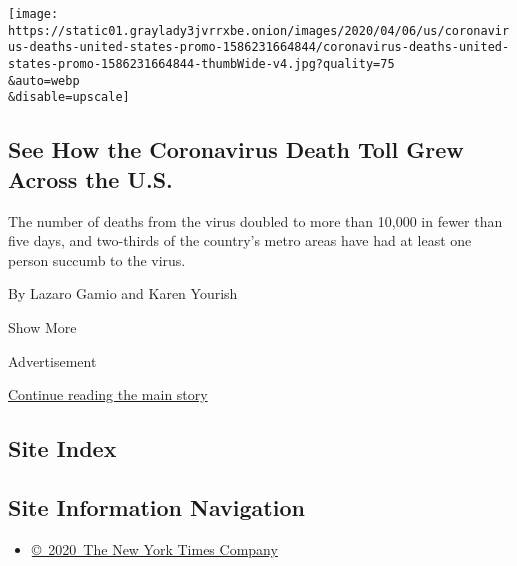 \begin{enumerate}
  \texttt{[image: https://static01.graylady3jvrrxbe.onion/images/2020/04/06/us/coronavirus-deaths-united-states-promo-1586231664844/coronavirus-deaths-united-states-promo-1586231664844-thumbWide-v4.jpg?quality=75\\\&auto=webp\\\&disable=upscale]}

  \hypertarget{see-how-the-coronavirus-death-toll-grew-across-the-us}{%
  \subsection{See How the Coronavirus Death Toll Grew Across the
  U.S.}\label{see-how-the-coronavirus-death-toll-grew-across-the-us}}

  The number of deaths from the virus doubled to more than 10,000 in
  fewer than five days, and two-thirds of the country's metro areas have
  had at least one person succumb to the virus.

  By Lazaro Gamio and Karen Yourish
\end{enumerate}

Show More

Advertisement

\protect\hyperlink{after-mid2}{Continue reading the main story}

\hypertarget{site-index}{%
\subsection{Site Index}\label{site-index}}

\hypertarget{site-information-navigation}{%
\subsection{Site Information
Navigation}\label{site-information-navigation}}

\begin{itemize}
\tightlist
\item
  \href{https://help.nytimes3xbfgragh.onion/hc/en-us/articles/115014792127-Copyright-notice}{©~2020~The
  New York Times Company}
\end{itemize}

